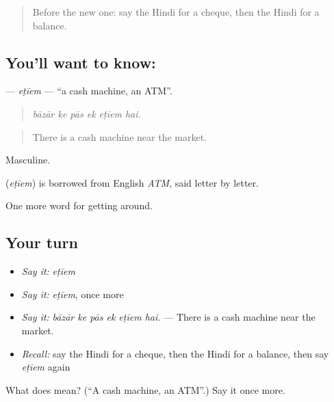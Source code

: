 \label{lesson:HI-C426-etiem}



\begin{quote}
Before the new one: say the Hindi for a cheque, then the Hindi for a balance.
\end{quote}

\subsection*{You'll want to know: }
\textbf{} — \emph{eṭīem} — \textquotedblleft{}a cash machine, an ATM\textquotedblright{}.

\begin{quote}
     
\end{quote}

\begin{quote}
\emph{bāzār ke pās ek eṭīem hai.}
\end{quote}

\begin{quote}
There is a cash machine near the market.
\end{quote}

Masculine.

\begin{cousinweb}
\textbf{} (\emph{eṭīem}) is borrowed from English \emph{ATM}, said letter by letter.
\end{cousinweb}

\begin{grammarlens}[title={What you've built}]
One more word for getting around.
\end{grammarlens}

\subsection*{Your turn}
\begin{itemize}
\raggedright
  \item \emph{Say it:} \emph{eṭīem}
  \item \emph{Say it:} \emph{eṭīem}, once more
  \item \emph{Say it:} \emph{bāzār ke pās ek eṭīem hai.} — There is a cash machine near the market.
  \item \emph{Recall:} say the Hindi for a cheque, then the Hindi for a balance, then say \emph{eṭīem} again
\end{itemize}

\begin{tcolorbox}[breakable,colback=teal!4,colframe=teal!35!black,title={Before you move on}]
What does  mean? (\textquotedblleft{}A cash machine, an ATM\textquotedblright{}.) Say it once more.
\end{tcolorbox}
